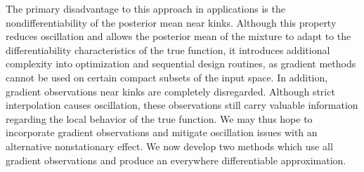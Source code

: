 \documentclass{article}
\begin{document}
The primary disadvantage to this approach in applications is the nondifferentiability of the posterior mean near kinks. Although this property reduces oscillation and allows the posterior mean of the mixture to adapt to the differentiability characteristics of the true function, it introduces additional complexity into optimization and sequential design routines, as gradient methods cannot be used on certain compact subsets of the input space. In addition, gradient observations near kinks are completely disregarded. Although strict interpolation causes oscillation, these observations still carry valuable information regarding the local behavior of the true function. We may thus hope to incorporate gradient observations and mitigate oscillation issues with an alternative nonstationary effect. We now develop two methods which use all gradient observations and produce an everywhere differentiable approximation.
\end{document}
